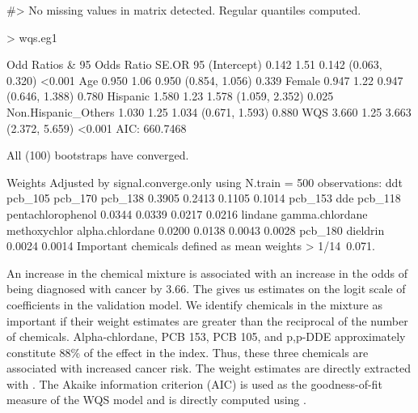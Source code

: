 \begin{Schunk}
\begin{Soutput}
#> No missing values in matrix detected. Regular quantiles computed.
\end{Soutput}
\begin{Sinput}
> wqs.eg1
\end{Sinput}
\begin{Soutput}

Odd Ratios & 95%
                     Odds Ratio  SE.OR                95%
(Intercept)               0.142   1.51  0.142 (0.063, 0.320)   <0.001
Age                       0.950   1.06  0.950 (0.854, 1.056)    0.339
Female                    0.947   1.22  0.947 (0.646, 1.388)    0.780
Hispanic                  1.580   1.23  1.578 (1.059, 2.352)    0.025
Non.Hispanic_Others       1.030   1.25  1.034 (0.671, 1.593)    0.880
WQS                       3.660   1.25  3.663 (2.372, 5.659)   <0.001
AIC:  660.7468 

All (100) bootstraps have converged. 

 Weights Adjusted by signal.converge.only using N.train = 500 observations: 
              ddt            pcb_105            pcb_170            pcb_138  
           0.3905             0.2413             0.1105             0.1014  
          pcb_153                dde            pcb_118  pentachlorophenol  
           0.0344             0.0339             0.0217             0.0216  
          lindane    gamma.chlordane       methoxychlor    alpha.chlordane  
           0.0200             0.0138             0.0043             0.0028  
          pcb_180           dieldrin  
           0.0024             0.0014  
Important chemicals defined as mean weights > 1/14~0.071. 
\end{Soutput}
\end{Schunk}

An increase in the chemical mixture is associated with an increase in
the odds of being diagnosed with cancer by 3.66. The
 gives us estimates on the logit scale of
coefficients in the validation model. We identify chemicals in the
mixture as important if their weight estimates are greater than the
reciprocal of the number of chemicals. Alpha-chlordane, PCB 153, PCB
105, and p,p-DDE approximately constitute 88\% of the effect in the
index. Thus, these three chemicals are associated with increased cancer
risk. The weight estimates are directly extracted with
. The Akaike information criterion
(AIC) is used as the goodness-of-fit measure of the WQS model and is
directly computed using .

